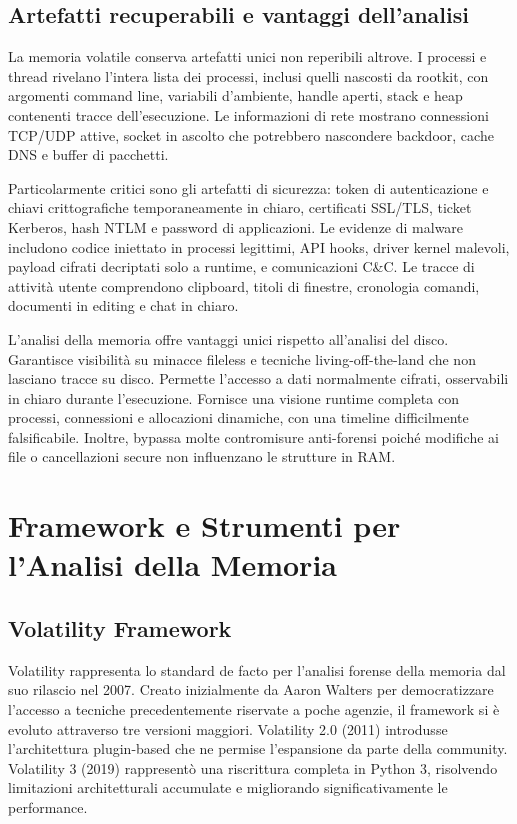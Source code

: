 \subsection{Artefatti recuperabili e vantaggi dell'analisi}

La memoria volatile conserva artefatti unici non reperibili altrove. I processi e thread rivelano l'intera lista dei processi, inclusi quelli nascosti da rootkit, con argomenti command line, variabili d'ambiente, handle aperti, stack e heap contenenti tracce dell'esecuzione. Le informazioni di rete mostrano connessioni TCP/UDP attive, socket in ascolto che potrebbero nascondere backdoor, cache DNS e buffer di pacchetti.

Particolarmente critici sono gli artefatti di sicurezza: token di autenticazione e chiavi crittografiche temporaneamente in chiaro, certificati SSL/TLS, ticket Kerberos, hash NTLM e password di applicazioni. Le evidenze di malware includono codice iniettato in processi legittimi, API hooks, driver kernel malevoli, payload cifrati decriptati solo a runtime, e comunicazioni C\&C. Le tracce di attività utente comprendono clipboard, titoli di finestre, cronologia comandi, documenti in editing e chat in chiaro.

L'analisi della memoria offre vantaggi unici rispetto all'analisi del disco. Garantisce visibilità su minacce fileless e tecniche living-off-the-land che non lasciano tracce su disco. Permette l'accesso a dati normalmente cifrati, osservabili in chiaro durante l'esecuzione. Fornisce una visione runtime completa con processi, connessioni e allocazioni dinamiche, con una timeline difficilmente falsificabile. Inoltre, bypassa molte contromisure anti-forensi poiché modifiche ai file o cancellazioni secure non influenzano le strutture in RAM.

\section{Framework e Strumenti per l'Analisi della Memoria}

\subsection{Volatility Framework}

Volatility \cite{volatility2024} rappresenta lo standard de facto per l'analisi forense della memoria dal suo rilascio nel 2007. Creato inizialmente da Aaron Walters per democratizzare l'accesso a tecniche precedentemente riservate a poche agenzie, il framework si è evoluto attraverso tre versioni maggiori. Volatility 2.0 (2011) introdusse l'architettura plugin-based che ne permise l'espansione da parte della community. Volatility 3 (2019) rappresentò una riscrittura completa in Python 3, risolvendo limitazioni architetturali accumulate e migliorando significativamente le performance.

